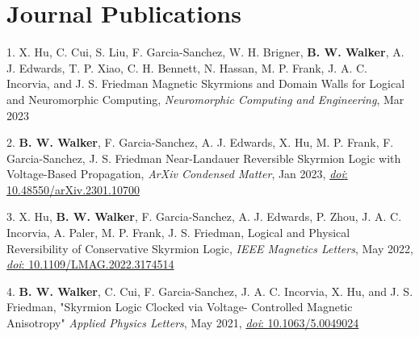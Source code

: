 \documentclass[letterpaper,11pt]{article}
\begin{document}
\section{Journal Publications}
    \begin{itemize}[leftmargin=0.15in, label={}]
        \small{\item{
         1.\hspace{3pt} X. Hu, C. Cui, S. Liu, F. Garcia-Sanchez, W. H. Brigner, \textbf{B. W. Walker}, A. J. Edwards, T. P. Xiao, C. H. Bennett, N. Hassan, M. P. Frank, J. A. C. Incorvia, and J. S. Friedman Magnetic Skyrmions and Domain Walls for Logical and Neuromorphic Computing, \textit{Neuromorphic Computing and Engineering}, Mar 2023
        }}
        \small{\item{
         2.\textbf{\hspace{3pt} B. W. Walker}, F. Garcia-Sanchez, A. J. Edwards, X. Hu, M. P. Frank, F. Garcia-Sanchez, J. S. Friedman Near-Landauer Reversible Skyrmion Logic with Voltage-Based Propagation, \textit{ArXiv Condensed Matter}, Jan 2023, \href{https://doi.org/10.48550/arXiv.2301.10700}{\textit{doi}: 10.48550/arXiv.2301.10700}
        }}
        \small{\item{
         3.\hspace{3pt} X. Hu, \textbf{B. W. Walker}, F. Garcia-Sanchez, A. J. Edwards, P. Zhou, J. A. C. Incorvia, A. Paler, M. P. Frank, J. S. Friedman, Logical and Physical Reversibility of Conservative Skyrmion Logic, \textit{IEEE Magnetics Letters}, May 2022, \href{https://doi.org/10.1109/LMAG.2022.3174514}{\textit{doi}: 10.1109/LMAG.2022.3174514}
        }}
        \small{\item{
         4.\textbf{\hspace{3pt} B. W. Walker}{, C. Cui, F. Garcia-Sanchez, J. A. C. Incorvia, X. Hu, and J. S. Friedman, "Skyrmion Logic Clocked via Voltage- Controlled Magnetic Anisotropy" \textit{Applied Physics Letters}, May 2021, \href{https://doi.org/10.1063/5.0049024}{\textit{doi}: 10.1063/5.0049024}}
        }}
     \end{itemize}
\end{document}
